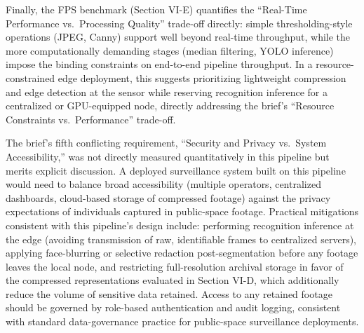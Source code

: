 \documentclass[conference]{IEEEtran}
\begin{document}
Finally, the FPS benchmark (Section VI-E) quantifies the ``Real-Time Performance vs.\ Processing Quality'' trade-off directly: simple thresholding-style operations (JPEG, Canny) support well beyond real-time throughput, while the more computationally demanding stages (median filtering, YOLO inference) impose the binding constraints on end-to-end pipeline throughput. In a resource-constrained edge deployment, this suggests prioritizing lightweight compression and edge detection at the sensor while reserving recognition inference for a centralized or GPU-equipped node, directly addressing the brief's ``Resource Constraints vs.\ Performance'' trade-off.

The brief's fifth conflicting requirement, ``Security and Privacy vs.\ System Accessibility,'' was not directly measured quantitatively in this pipeline but merits explicit discussion. A deployed surveillance system built on this pipeline would need to balance broad accessibility (multiple operators, centralized dashboards, cloud-based storage of compressed footage) against the privacy expectations of individuals captured in public-space footage. Practical mitigations consistent with this pipeline's design include: performing recognition inference at the edge (avoiding transmission of raw, identifiable frames to centralized servers), applying face-blurring or selective redaction post-segmentation before any footage leaves the local node, and restricting full-resolution archival storage in favor of the compressed representations evaluated in Section VI-D, which additionally reduce the volume of sensitive data retained. Access to any retained footage should be governed by role-based authentication and audit logging, consistent with standard data-governance practice for public-space surveillance deployments.
\end{document}
